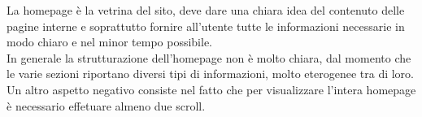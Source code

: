 La homepage è la vetrina del sito, deve dare una chiara idea del contenuto delle pagine interne e soprattutto fornire all'utente tutte le informazioni necessarie in
modo chiaro e nel minor tempo possibile.\\
In generale la strutturazione dell'homepage non è molto chiara, dal momento che le varie sezioni riportano diversi tipi di informazioni, molto eterogenee tra di loro.\\
Un altro aspetto negativo consiste nel fatto che per visualizzare l'intera homepage è necessario effetuare almeno due scroll.\\
